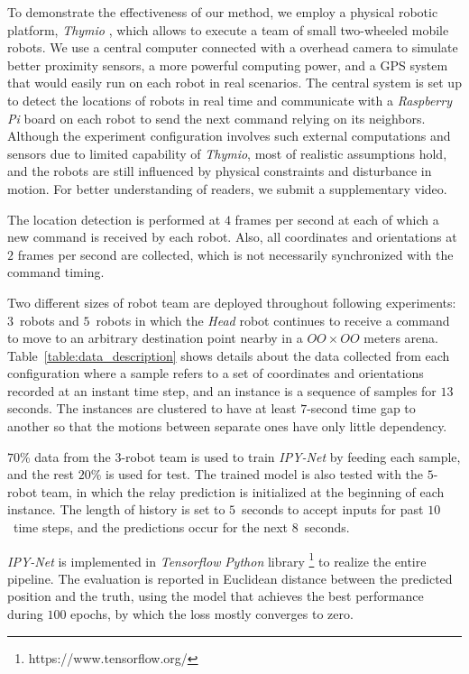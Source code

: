 \documentclass[letterpaper, 10 pt, conference]{ieeeconf}  %
\begin{document}
	
	To demonstrate the effectiveness of our method, we employ a physical robotic platform, 
	\emph{Thymio} \cite{Shin14}, which allows to execute a team of small two-wheeled mobile robots.   
	We use a central computer connected with a overhead camera to simulate better proximity 
	sensors, a more powerful computing power, and a GPS system that would easily run on each robot in 
	real scenarios. The central system is set up to detect the locations of robots in real time 
	and communicate with a \emph{Raspberry Pi} board \cite{Upton14} on each robot to send
	the next command relying on its neighbors. Although the experiment configuration involves 
	such external computations and sensors due to limited capability of \emph{Thymio}, 
	most of realistic assumptions hold, and the robots are still influenced by 
	physical constraints and disturbance in motion. For better understanding of readers, 
	we submit a supplementary video. 
	
	The location detection is performed at $4$ frames per second at each of which 
	a new command is received by each robot. Also, 
	all coordinates and orientations at $2$ frames per second are collected, which 
	is not necessarily synchronized with the command timing. 
	
	Two different sizes of robot team are deployed throughout following experiments: 
	$3$~robots and $5$~robots in which the \emph{Head} robot continues to receive a command to 
	move to an arbitrary destination point nearby in a $OO \times OO$ meters arena. 
	Table~\ref{table:data_description} shows details about the data collected from 
	each configuration where a sample refers to a set of coordinates and orientations recorded 
	at an instant time step, and an instance is a sequence of samples for $13$ seconds. 
	The instances are clustered to have at least $7$-second time gap to another so that
	the motions between separate ones have only little dependency. 
	
	$70$\% data from the $3$-robot team is used to train \emph{IPY-Net} by feeding each sample, 
	and the rest $20$\% is used for test. 
	The trained model is also tested with the $5$-robot team, in which the relay prediction is 
	initialized at the beginning of each instance. 
	The length of history is set to $5$~seconds to accept inputs for past $10$~time steps, and 
	the predictions occur for the next $8$~seconds.  
	 	
	\emph{IPY-Net} is implemented in \emph{Tensorflow} \emph{Python} library \footnote{https://www.tensorflow.org/} 
	to realize the entire pipeline. The evaluation is reported in Euclidean distance between 
	the predicted position and the truth, using the model that achieves the best performance 
	during $100$ epochs, by which the loss mostly converges to zero. 
\end{document}
